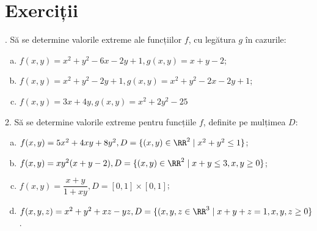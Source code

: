 
\section{Exerciții}

\indent{}. Să se determine valorile extreme ale funcțiilor $ f $,
cu legătura $ g $ în cazurile:
\begin{enumerate}[(a)]
\item $ f(x, y) = x^2 + y^2 - 6x - 2y + 1, g(x, y) = x + y - 2 $;
\item $ f(x, y) = x^2 + y^2 - 2y + 1, g(x, y) = x^2 + y^2 - 2x - 2y + 1 $;
\item $ f(x, y) = 3x + 4y, g(x, y) = x^2 + 2y^2 - 25 $
\end{enumerate}

\vspace{1cm}

2. Să se determine valorile extreme pentru funcțiile $ f $, definite pe
mulțimea $ D $:
\begin{enumerate}[(a)]
\item $ f(x, y) = 5x^2 + 4xy + 8y^2, D = \{(x, y) \in \RR^2 \mid x^2 + y^2 \leq 1 \} $;
\item $ f(x, y) = xy^2(x + y - 2), D = \{(x, y) \in \RR^2 \mid x + y \leq 3, x, y \geq 0 \} $;
\item $ f(x, y) = \dfrac{x + y}{1 + xy}, D = [0, 1] \times [0, 1] $;
\item $ f(x, y, z) = x^2 + y^2 + xz - yz, D = \{(x, y, z \in \RR^3 \mid %
  x + y + z = 1, x, y, z \geq 0 \} $.
\end{enumerate}

